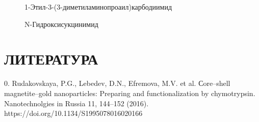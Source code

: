 \documentclass[12pt, a4paper]{article}
\begin{document}
\begin{figure}[ht!]
  \centering 
  \captionsetup{labelformat=empty}
  \caption{1-Этил-3-(3-диметиламинопроаил)карбодиимид}
\end{figure}

\begin{figure}[ht!]
  \centering 
  \captionsetup{labelformat=empty}
  \caption{N-Гидроксисукцинимид}
\end{figure}

\newpage

\section*{ЛИТЕРАТУРА}
0. Rudakovskaya, P.G., Lebedev, D.N., Efremova, M.V. et al. Сore–shell magnetite–gold nanoparticles: Preparing and functionalization by chymotrypsin. \\
Nanotechnolgies in Russia 11, 144–152 (2016). https://doi.org/10.1134/S1995078016020166
\end{document}
